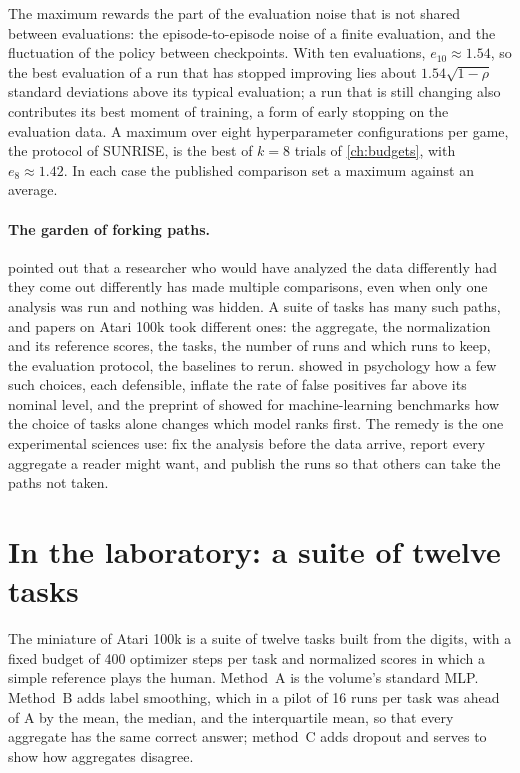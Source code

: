 \begin{refsection}
The maximum rewards the part of the evaluation noise that is not shared between evaluations: the episode-to-episode noise of a finite evaluation, and the fluctuation of the policy between checkpoints. With ten evaluations, $e_{10}\approx1.54$, so the best evaluation of a run that has stopped improving lies about $1.54\sqrt{1-\rho}$ standard deviations above its typical evaluation; a run that is still changing also contributes its best moment of training, a form of early stopping on the evaluation data. A maximum over eight hyperparameter configurations per game, the protocol of SUNRISE, is the best of $k=8$ trials of \cref{ch:budgets}, with $e_8\approx1.42$. In each case the published comparison set a maximum against an average.

\paragraph{The garden of forking paths.} \Textcite{GelmanLoken2013,GelmanLoken2014} pointed out that a researcher who would have analyzed the data differently had they come out differently has made multiple comparisons, even when only one analysis was run and nothing was hidden. A suite of tasks has many such paths, and papers on Atari 100k took different ones: the aggregate, the normalization and its reference scores, the tasks, the number of runs and which runs to keep, the evaluation protocol, the baselines to rerun. \Textcite{SimmonsEtAl2011} showed in psychology how a few such choices, each defensible, inflate the rate of false positives far above its nominal level, and the preprint of \textcite{DehghaniEtAl2021} showed for machine-learning benchmarks how the choice of tasks alone changes which model ranks first. The remedy is the one experimental sciences use: fix the analysis before the data arrive, report every aggregate a reader might want, and publish the runs so that others can take the paths not taken.

\section{In the laboratory: a suite of twelve tasks}\label{sec:aggregates:lab}

The miniature of Atari 100k is a suite of twelve tasks built from the digits, with a fixed budget of 400 optimizer steps per task and normalized scores in which a simple reference plays the human. Method~A is the volume's standard MLP. Method~B adds label smoothing, which in a pilot of 16 runs per task was ahead of A by the mean, the median, and the interquartile mean, so that every aggregate has the same correct answer; method~C adds dropout and serves to show how aggregates disagree.


\end{refsection}
